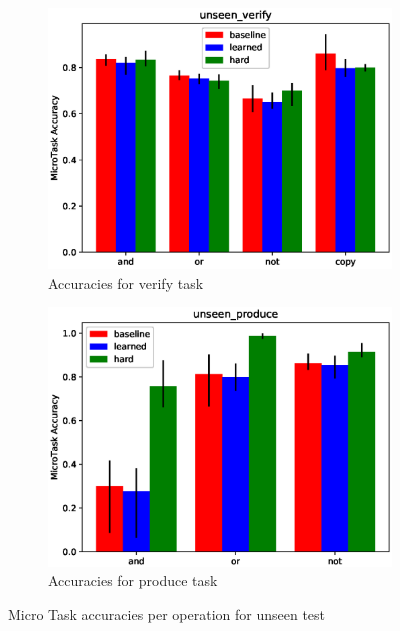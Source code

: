 \begin{figure}[ht] 
	\begin{subfigure}[b]{0.5\linewidth}
		\centering
		\includegraphics[width=0.95\linewidth]{./figs/micro/unseen_verify}
		\caption{Accuracies for verify task } 
		\label{mtu1} 
		\vspace{2ex}
	\end{subfigure}%
	\begin{subfigure}[b]{0.5\linewidth}
		\centering
		\includegraphics[width=0.95\linewidth]{./figs/micro/unseen_produce}
		\caption{Accuracies for produce task } 
		\label{mtu2} 
		\vspace{2ex}
	\end{subfigure}
	\caption{Micro Task accuracies per operation for unseen test }
	\label{mtu}
\end{figure}
